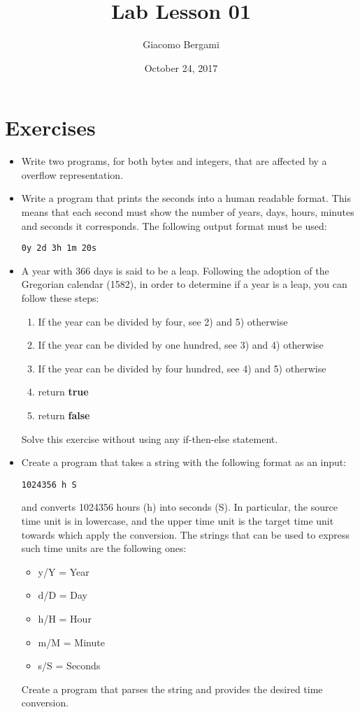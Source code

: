 \documentclass[]{scrartcl}
\title{Lab Lesson 01}
\date{October 24, 2017}
\author{Giacomo Bergami}
\begin{document}
\maketitle
\section*{Exercises}

\begin{itemize}
\item Write two programs, for both bytes and integers, that are affected by a overflow representation.
\item Write a program that prints the seconds into a human readable format. This means that each second must show the number of years, days, hours, minutes and seconds it corresponds. The following output format must be used:
\begin{center}
\texttt{0y 2d 3h 1m 20s}
\end{center}
\item A year with 366 days is said to be a leap. Following the adoption of the Gregorian calendar (1582), in order to determine if a year is a leap, you can follow these steps:
\begin{enumerate}
\item If the year can be divided by four, see 2) and 5) otherwise
\item If the year can be divided by one hundred, see 3) and 4) otherwise
\item If the year can be divided by four hundred, see 4) and 5) otherwise
\item return \textbf{true}
\item return \textbf{false}
\end{enumerate}
Solve this exercise without using any if-then-else statement.

\item Create a program that takes a string with the following format as an input:
\begin{center}
	\texttt{1024356 h S}
\end{center}
and converts 1024356 hours (h) into seconds (S). In particular, the source  time unit is in lowercase, and the upper time unit is the target time unit towards which apply the conversion. The strings that can be used to express such time units are the following ones:
\begin{itemize}
\item y/Y = Year
\item d/D = Day
\item  h/H = Hour
\item  m/M = Minute
\item  s/S = Seconds
\end{itemize}
Create a program that parses the string and provides the desired time conversion.


\end{itemize}
\end{document}
